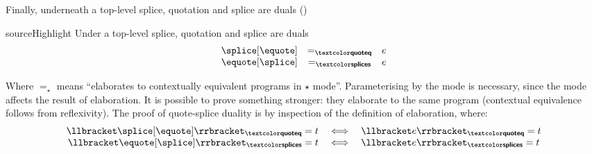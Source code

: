 
Finally, underneath a top-level splice, quotation and splice are duals ()

\begin{theorem}{sourceHighlight}\label{thm:quote-splice-duality}
  Under a top-level splice, quotation and splice are duals
  \[\begin{array}{rcl}
\splice[{\equote}] & =_{\quotemode{}} & e \\
\equote[{\splice}] & =_{\splicemode{}} & e
\end{array}
\]
\end{theorem}
Where $=_{\star}$ means ``elaborates to contextually equivalent \coreLang{} programs in $\star$ mode''. Parameterising by the mode is necessary, since the mode affects the result of elaboration. It is possible to prove something stronger: they elaborate to the same \coreLang{} program (contextual equivalence follows from reflexivity). The proof of quote-splice duality is by inspection of the definition of elaboration, where:
\[\begin{array}{rcl}  
  \elaborate{\splice[{\equote}]}_{\quotemode{}} = t & \iff & \elaborate{e}_{\quotemode{}} = t\\
  \elaborate{\equote[{\splice}]}_{\splicemode{}} = t & \iff & \elaborate{e}_{\splicemode{}} = t
\end{array}
  \]


